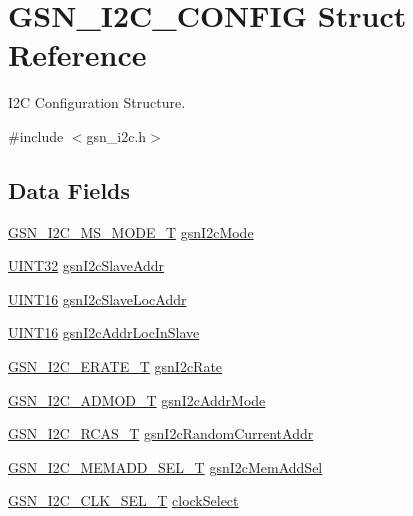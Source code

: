 \hypertarget{a00099}{
\section{GSN\_\-I2C\_\-CONFIG Struct Reference}
\label{a00099}
}


I2C Configuration Structure.  




{\ttfamily \#include $<$gsn\_\-i2c.h$>$}

\subsection*{Data Fields}
\begin{DoxyCompactItemize}
\item 
\hyperlink{a00649_ga72605883ea904f4ee6c310a25142a0ab}{GSN\_\-I2C\_\-MS\_\-MODE\_\-T} \hyperlink{a00099_a476f4378cbde27912a42698a30f14f02}{gsnI2cMode}
\item 
\hyperlink{a00660_gae1e6edbbc26d6fbc71a90190d0266018}{UINT32} \hyperlink{a00099_aa2b4613ed8c0e26e49720fc090b7efad}{gsnI2cSlaveAddr}
\item 
\hyperlink{a00660_ga09f1a1fb2293e33483cc8d44aefb1eb1}{UINT16} \hyperlink{a00099_a361e41e5d60cc3a794a3608bcb3f8efe}{gsnI2cSlaveLocAddr}
\item 
\hyperlink{a00660_ga09f1a1fb2293e33483cc8d44aefb1eb1}{UINT16} \hyperlink{a00099_ac91130210ef7f9821e15dcdfc901ac08}{gsnI2cAddrLocInSlave}
\item 
\hyperlink{a00649_gad834947ae5685696ffea0ecec904b16e}{GSN\_\-I2C\_\-ERATE\_\-T} \hyperlink{a00099_ae6ed37a339fb3b3969854340f05db960}{gsnI2cRate}
\item 
\hyperlink{a00649_gac3021fdaf2e11a7972d53d5292ad5f26}{GSN\_\-I2C\_\-ADMOD\_\-T} \hyperlink{a00099_a3221d97c6ba51effe1e052f70d45fab9}{gsnI2cAddrMode}
\item 
\hyperlink{a00649_ga3e0976c06462690937465a53a0c38cc4}{GSN\_\-I2C\_\-RCAS\_\-T} \hyperlink{a00099_a1d3067a51598b4348a319a343ffc8de5}{gsnI2cRandomCurrentAddr}
\item 
\hyperlink{a00649_ga3c8e92172b940c58950060ddbccee36d}{GSN\_\-I2C\_\-MEMADD\_\-SEL\_\-T} \hyperlink{a00099_a9a0a25d2342c59c04a70bbc9fbf21c9b}{gsnI2cMemAddSel}
\item 
\hyperlink{a00649_gaced0c2ab1bd7baab4cc105c12ccc1ce0}{GSN\_\-I2C\_\-CLK\_\-SEL\_\-T} \hyperlink{a00099_ad3ca20b8730be685c68d651aae8045f1}{clockSelect}
\end{DoxyCompactItemize}


